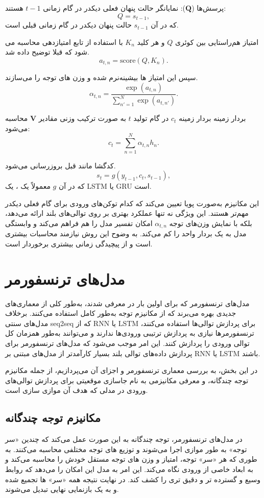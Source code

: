 پرسش‌ها ($\mathbf{Q}$):
نمایانگر حالت پنهان فعلی دیکدر در گام زمانی  $t-1 $ هستند:  
$$
Q = s_{t-1},
$$
که در آن \( s_{t-1} \) حالت پنهان دیکدر در گام زمانی قبلی است.

امتیاز هم‌راستایی بین کوئری $Q$ و هر کلید $ K_n $  با استفاده از تابع امتیازدهی محاسبه می شود که قبلا توضیح داده شد.
$$
a_{t, n} = \text{score}(Q, K_n).
$$

سپس این امتیاز ها بیشینه‌نرم شده و وزن های توجه را می‌سازند.
$$
\alpha_{t, n} = \frac{\exp(a_{t, n})}{\sum_{n'=1}^N \exp(a_{t, n'})}.
$$

بردار زمینه  
بردار زمینه $ c_t $ در گام تولید $t$ به صورت ترکیب وزنی مقادیر $\mathbf{V}$
محاسبه می‌شود:  
$$
c_t = \sum_{n=1}^N \alpha_{t, n} h_n.
$$


 کدگشا مانند قبل بروزرسانی می‌شود.  
$$
s_t = g(y_{t-1}, c_t, s_{t-1}),
$$
که در آن $g$ معمولاً یک ، یک
LSTM
 یا GRU است.

این مکانیزم به‌صورت پویا تعیین می‌کند که کدام توکن‌های ورودی برای گام فعلی دیکدر مهم‌تر هستند. این ویژگی نه تنها عملکرد بهتری بر روی توالی‌های بلند ارائه می‌دهد، بلکه با نمایش وزن‌های توجه $\alpha_{t,n}$ امکان تفسیر مدل را هم فراهم می‌کند و وابستگی مدل به یک بردار واحد را کم می‌کند. به وضوح این روش نیازمند محاسبات بیشتری است و از پیچیدگی زمانی بیشتری برخوردار است.

\section{مدل‌های ترنسفورمر}

مدل‌های ترنسفورمر که برای اولین بار در \cite{vaswaniAttentionAllYou2023} معرفی شدند، به‌طور کلی از معماری‌های جدیدی بهره می‌برند که از مکانیزم توجه به‌طور کامل استفاده می‌کنند. برخلاف مدل‌های سنتی seq2seq که از RNN یا LSTM برای پردازش توالی‌ها استفاده می‌کنند، ترنسفورمرها نیازی به پردازش ترتیبی ورودی‌ها ندارند و می‌توانند به‌طور همزمان کل توالی ورودی را پردازش کنند. این امر موجب می‌شود که مدل‌های ترنسفورمر برای پردازش داده‌های توالی بلند بسیار کارآمدتر از مدل‌های مبتنی بر RNN یا LSTM باشند.

در این بخش، به بررسی معماری ترنسفورمر و اجزای آن می‌پردازیم، از جمله مکانیزم توجه چندگانه، و معرفی مکانیزمی به نام جاسازی موقعیتی%
برای پردازش توالی‌های ورودی در مدلی که هدف آن موازی سازی است.
\subsection{مکانیزم توجه چندگانه}
در مدل‌های ترنسفورمر، توجه چندگانه به این صورت عمل می‌کند که چندین «سر توجه»%
به طور موازی اجرا می‌شوند و توزیع های توجه مختلفی محاسبه می‌کنند. به طوری که هر «سر» توجه، امتیاز و وزن های توجه مستقل خودش را محاسبه می‌کند و به ابعاد خاصی از ورودی نگاه می‌کند. این امر به مدل این امکان را می‌دهد که روابط وسیع و گسترده تر و دقیق تری را کشف کند. در نهایت نتیجه همه «سر» ها تجمیع شده و به یک بازنمایی نهایی تبدیل می‌شوند.

